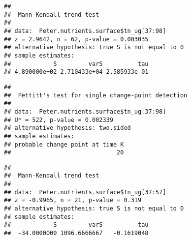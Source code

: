 \documentclass[]{article}
\newenvironment{Shaded}{\begin{snugshade}}{\end{snugshade}}
\newcommand{\KeywordTok}[1]{\textcolor[rgb]{0.13,0.29,0.53}{\textbf{#1}}}
\newcommand{\DecValTok}[1]{\textcolor[rgb]{0.00,0.00,0.81}{#1}}
\newcommand{\CommentTok}[1]{\textcolor[rgb]{0.56,0.35,0.01}{\textit{#1}}}
\newcommand{\OperatorTok}[1]{\textcolor[rgb]{0.81,0.36,0.00}{\textbf{#1}}}
\newcommand{\NormalTok}[1]{#1}
\begin{document}
\begin{verbatim}
## 
##  Mann-Kendall trend test
## 
## data:  Peter.nutrients.surface$tn_ug[37:98]
## z = 2.9642, n = 62, p-value = 0.003035
## alternative hypothesis: true S is not equal to 0
## sample estimates:
##            S         varS          tau 
## 4.890000e+02 2.710433e+04 2.585933e-01
\end{verbatim}

\begin{Shaded}
\end{Shaded}

\begin{verbatim}
## 
##  Pettitt's test for single change-point detection
## 
## data:  Peter.nutrients.surface$tn_ug[37:98]
## U* = 522, p-value = 0.002339
## alternative hypothesis: two.sided
## sample estimates:
## probable change point at time K 
##                              20
\end{verbatim}

\begin{Shaded}
\end{Shaded}

\begin{verbatim}
## 
##  Mann-Kendall trend test
## 
## data:  Peter.nutrients.surface$tn_ug[37:57]
## z = -0.9965, n = 21, p-value = 0.319
## alternative hypothesis: true S is not equal to 0
## sample estimates:
##            S         varS          tau 
##  -34.0000000 1096.6666667   -0.1619048
\end{verbatim}

\begin{Shaded}
\end{Shaded}
\end{document}
